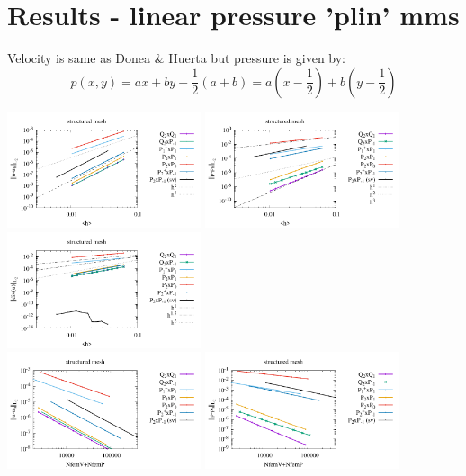 \newpage
\section*{Results - linear pressure 'plin' mms }

Velocity is same as Donea \& Huerta but pressure is given by:
\[
p(x,y) = ax+by - \frac12(a+b) = a \left(x-\frac12\right) + b\left(y-\frac12 \right)
\]

\begin{center}
\includegraphics[width=5.7cm]{python_codes/fieldstone_120/paperresults/plin_structured_errorsV.pdf}
\includegraphics[width=5.7cm]{python_codes/fieldstone_120/paperresults/plin_structured_errorsP.pdf}
\includegraphics[width=5.7cm]{python_codes/fieldstone_120/paperresults/plin_structured_errors_divv.pdf}\\
\includegraphics[width=5.7cm]{python_codes/fieldstone_120/paperresults/plin_structured_errorsV2.pdf}
\includegraphics[width=5.7cm]{python_codes/fieldstone_120/paperresults/plin_structured_errorsP2.pdf}

\end{center}
